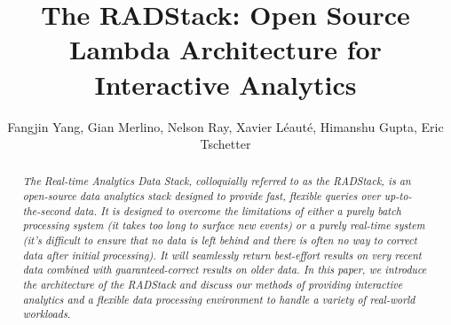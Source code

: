 \documentclass{vldb}
\begin{document}

\title{The RADStack: Open Source Lambda Architecture for Interactive Analytics}

\author{
  \alignauthor Fangjin Yang, Gian Merlino, Nelson Ray, Xavier Léauté, Himanshu Gupta, Eric Tschetter\\
}



%
%
%
%

\maketitle

\begin{abstract}
\textit{The Real-time Analytics Data Stack, colloquially referred to
as the RADStack, is an open-source data analytics stack designed to provide
fast, flexible queries over up-to-the-second data. It is designed to overcome
the limitations of either a purely batch processing system (it takes too
long to surface new events) or a purely real-time system (it's difficult to
ensure that no data is left behind and there is often no way to correct data
after initial processing). It will seamlessly return best-effort results on
very recent data combined with guaranteed-correct results on older data. In
this paper, we introduce the architecture of the RADStack and discuss our
methods of providing interactive analytics and a flexible data processing
environment to handle a variety of real-world workloads.}
\end{abstract}
\end{document}
